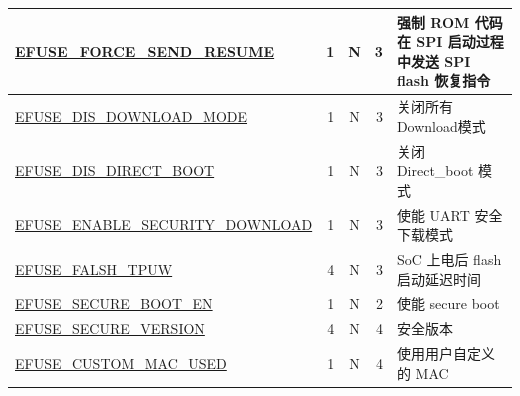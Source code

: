\begin{longtable}[l]{ |m{7.5cm}|r|c|r|m{10cm}| }
    \hline
    \hyperref[fielddesc:EFUSEFORCESENDRESUME]{EFUSE\_FORCE\_SEND\_RESUME} & 1 & N & 3 & 强制 ROM 代码在 SPI 启动过程中发送 SPI flash 恢复指令 \\ 
    \hline    
    \hyperref[fielddesc:EFUSEDISDOWNLOADMODE]{EFUSE\_DIS\_DOWNLOAD\_MODE}  & 1 & N & 3 & 关闭所有 Download模式\\    
    \hline
    \hyperref[fielddesc:EFUSEDISDIRECTBOOT]{EFUSE\_DIS\_DIRECT\_BOOT} & 1 & N & 3 & 关闭 Direct\_boot 模式\\ 
    \hline
    \hyperref[fielddesc:EFUSEENABLESECURITYDOWNLOAD]{EFUSE\_ENABLE\_SECURITY\_DOWNLOAD} & 1 & N & 3 & 使能 UART 安全下载模式\\
    \hline
    \hyperref[fielddesc:EFUSEFLASHTPUW]{EFUSE\_FALSH\_TPUW} & 4 & N & 3 & SoC 上电后 flash 启动延迟时间\\
    \hline
    \hyperref[fielddesc:EFUSESECUREBOOTEN]{EFUSE\_SECURE\_BOOT\_EN} & 1 & N & 2 & 使能 secure boot\\
    \hline
    \hyperref[fielddesc:EFUSESECUREVERSION]{EFUSE\_SECURE\_VERSION} & 4 & N & 4 & 安全版本\\
    \hline
    \hyperref[fielddesc:EFUSECUSTOMMACUSED]{EFUSE\_CUSTOM\_MAC\_USED} & 1 & N & 4 & 使用用户自定义的 MAC\\    
    \hline    
\end{longtable}
